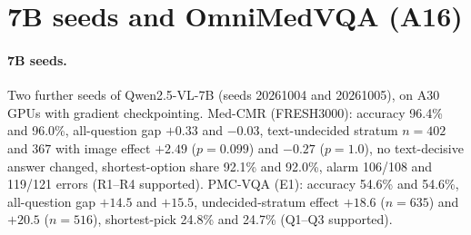 \begin{table}[h]
  \centering
  \footnotesize
  \setlength{\tabcolsep}{2.4pt}
  \caption{\textbf{Shortcut-rescue runs (PMC-VQA, planted length cue).} $g$: image benefit (points); accuracies (\%) on the planted and on the cue-free test; short.: share of shortest-option predictions; $M_T$: median text margin.}
  \label{tab:rescue}
\end{table}

\section{7B seeds and OmniMedVQA (A16)}
\label{app:a16}

\paragraph{7B seeds.}
Two further seeds of Qwen2.5-VL-7B (seeds 20261004 and 20261005), on A30 GPUs with gradient checkpointing.
Med-CMR (FRESH3000): accuracy 96.4\% and 96.0\%, all-question gap $+0.33$ and $-0.03$, text-undecided stratum $n=402$ and $367$ with image effect $+2.49$ ($p=0.099$) and $-0.27$ ($p=1.0$), no text-decisive answer changed, shortest-option share 92.1\% and 92.0\%, alarm 106/108 and 119/121 errors (R1--R4 supported).
PMC-VQA (E1): accuracy 54.6\% and 54.6\%, all-question gap $+14.5$ and $+15.5$, undecided-stratum effect $+18.6$ ($n=635$) and $+20.5$ ($n=516$), shortest-pick 24.8\% and 24.7\% (Q1--Q3 supported).

